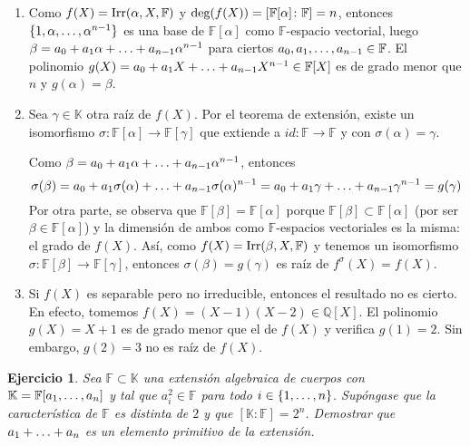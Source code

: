 \documentclass[11pt]{report}
\makeatletter
\renewenvironment{proof}[1][\proofname]{\par
  \pushQED{\qed}%
  \normalfont \topsep\z@skip %
  \trivlist
  \item[\hskip\labelsep
        \itshape
    #1\@addpunct{.}]\ignorespaces
}{%
  \popQED\endtrivlist\@endpefalse
}
\newcommand{\Q}{\mathbb Q}
\newcommand{\F}{\mathbb F}
\newcommand{\K}{\mathbb K}
\newtheorem{ejercicio}{Ejercicio}
\makeatother
\begin{document}
\begin{proof}
\hfill
\begin{enumerate}
    \item Como $f(X) = \textup{Irr}(\alpha,X,\F)$ y $\textup{deg}(f(X)) = [\F[\alpha] \colon \F] = n$, entonces $\{1,\alpha,\mathellipsis,\alpha^{n-1}\}$ es una base de $\F[\alpha]$ como $\F$-espacio vectorial, luego $\beta = a_0+a_1\alpha+\mathellipsis+a_{n-1}\alpha^{n-1}$ para ciertos $a_0,a_1,\mathellipsis,a_{n-1} \in \F$. El polinomio $g(X) = a_0+a_1X+\mathellipsis+a_{n-1}X^{n-1} \in \F[X]$ es de grado menor que $n$ y $g(\alpha) =\beta$.
    \item Sea $\gamma \in \K$ otra raíz de $f(X)$. Por el teorema de extensión, existe un isomorfismo $\sigma \colon \F[\alpha] \to \F[\gamma]$ que extiende a $id \colon \F \to \F$ y con $\sigma(\alpha)=\gamma$.
    \begin{center}
    \end{center}
    Como $\beta = a_0+a_1\alpha+\mathellipsis+a_{n-1}\alpha^{n-1}$, entonces \[\sigma(\beta) = a_0+a_1\sigma(\alpha)+\mathellipsis+a_{n-1}\sigma(\alpha)^{n-1} = a_0+a_1\gamma+\mathellipsis+a_{n-1}\gamma^{n-1} = g(\gamma)\]
    Por otra parte, se observa que $\F[\beta] = \F[\alpha]$ porque $\F[\beta] \subset \F[\alpha]$ (por ser $\beta \in \F[\alpha]$) y la dimensión de ambos como $\F$-espacios vectoriales es la misma: el grado de $f(X)$. Así, como $f(X) = \textup{Irr}(\beta,X,\F)$ y tenemos un isomorfismo $\sigma \colon \F[\beta] \to \F[\gamma]$, entonces $\sigma(\beta) = g(\gamma)$ es raíz de $f^{\sigma}(X) = f(X)$.
    \item Si $f(X)$ es separable pero no irreducible, entonces el resultado no es cierto. En efecto, tomemos $f(X)=(X-1)(X-2) \in \Q[X]$. El polinomio $g(X)=X+1$ es de grado menor que el de $f(X)$ y verifica $g(1) = 2$. Sin embargo, $g(2) =3$ no es raíz de $f(X)$. \qedhere
\end{enumerate}
\end{proof}

\begin{ejercicio}
Sea $\F \subset \K$ una extensión algebraica de cuerpos con $\K = \F[a_1,\mathellipsis,a_n]$ y tal que $a_i^2 \in \F$ para todo $i \in \{1,\mathellipsis,n\}$. Supóngase que la característica de $\F$ es distinta de $2$ y que $[\K \colon \F] = 2^n$. Demostrar que $a_1+\mathellipsis+a_n$ es un elemento primitivo de la extensión.
\end{ejercicio}
\end{document}
